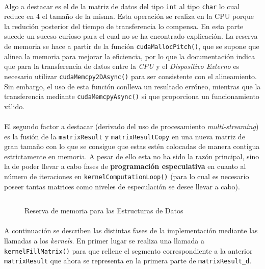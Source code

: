 \documentclass[10pt, a4paper,spanish]{article}
\begin{document}
		\paragraph{}
		Algo a destacar es el  de la matriz de datos del tipo \texttt{int} al tipo \texttt{char} lo cual reduce en 4 el tamaño de la misma. Esta operación se realiza en la CPU porque la redución posterior del tiempo de transferencia lo compensa. En esta parte sucede un suceso curioso para el cual no se ha encontrado explicación. La reserva de memoria se hace a partir de la función \texttt{cudaMallocPitch()}, que se supone que alinea la memoria para mejorar la eficiencia, por lo que la documentación indica que para la transferencia de datos entre la \emph{CPU} y el \emph{Dispositivo Externo} es necesario utilizar \texttt{cudaMemcpy2DAsync()} para ser consistente con el alineamiento. Sin embargo, el uso de esta función conlleva un resultado erróneo, mientras que la transferencia mediante \texttt{cudaMemcpyAsync()} si que proporciona un funcionamiento válido.

		\paragraph{}
		El segundo factor a destacar (derivado del uso de procesamiento \emph{multi-streaming}) es la fusión de la \texttt{matrixResult} y \texttt{matrixResultCopy} en una nueva matriz de gran tamaño con lo que se consigue que estas estén colocadas de manera contigua estrictamente en memoria. A pesar de ello esta no ha sido la razón principal, sino la de poder llevar a cabo fases de \textbf{programación especulativa} en cuanto al número de iteraciones en \texttt{kernelComputationLoop()} (para lo cual es necesario poseer tantas matrices como niveles de especulación se desee llevar a cabo).

		\begin{figure}[h]
			\centering
			\inputminted{cuda}{./code/malloc.cu}
			\caption{Reserva de memoria para las Estructuras de Datos}
			\label{code:malloc}
		\end{figure}

		\paragraph{}
		A continuación se describen las distintas fases de la implementación mediante las llamadas a los \emph{kernels}. En primer lugar se realiza una llamada a \texttt{kernelFillMatrix()} para que rellene el segmento correspondiente a la anterior \texttt{matrixResult} que ahora se representa en la primera parte de \texttt{matrixResult\_d}.
\end{document}
